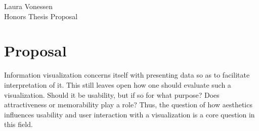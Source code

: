 \documentclass[12pt]{article}
\begin{document}
{\raggedleft 
	Laura Vonessen\\
	Honors Thesis Proposal\\ 
}

\section{Proposal}



Information visualization concerns itself with presenting data so as to facilitate interpretation of it. 
This still leaves open how one should evaluate such a visualization. 
Should it be usability, but if so for what purpose?
Does attractiveness or memorability play a role?
Thus, the question of how aesthetics influences usability and user interaction with a visualization is a core question in this field. 
\\
\end{document}
